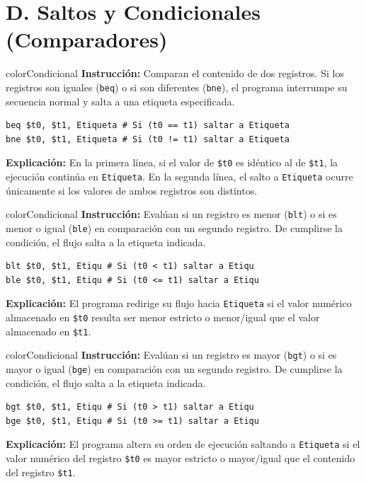 \documentclass[12pt,a4paper]{article}
\begin{document}
\section*{\textcolor{colorCondicional}{D. Saltos y Condicionales (Comparadores)}}

\begin{instructionBox}{colorCondicional}
\textbf{Instrucción:} Comparan el contenido de dos registros. Si los registros son iguales (\texttt{beq}) o si son diferentes (\texttt{bne}), el programa interrumpe su secuencia normal y salta a una etiqueta especificada.
\begin{lstlisting}
beq $t0, $t1, Etiqueta # Si (t0 == t1) saltar a Etiqueta
bne $t0, $t1, Etiqueta # Si (t0 != t1) saltar a Etiqueta
\end{lstlisting}
\textbf{Explicación:} En la primera línea, si el valor de \texttt{\$t0} es idéntico al de \texttt{\$t1}, la ejecución continúa en \texttt{Etiqueta}. En la segunda línea, el salto a \texttt{Etiqueta} ocurre únicamente si los valores de ambos registros son distintos.
\end{instructionBox}

\begin{instructionBox}{colorCondicional}
\textbf{Instrucción:} Evalúan si un registro es menor (\texttt{blt}) o si es menor o igual (\texttt{ble}) en comparación con un segundo registro. De cumplirse la condición, el flujo salta a la etiqueta indicada.
\begin{lstlisting}
blt $t0, $t1, Etiqu # Si (t0 < t1) saltar a Etiqu
ble $t0, $t1, Etiqu # Si (t0 <= t1) saltar a Etiqu
\end{lstlisting}
\textbf{Explicación:} El programa redirige su flujo hacia \texttt{Etiqueta} si el valor numérico almacenado en \texttt{\$t0} resulta ser menor estricto o menor/igual que el valor almacenado en \texttt{\$t1}.
\end{instructionBox}

\begin{instructionBox}{colorCondicional}
\textbf{Instrucción:} Evalúan si un registro es mayor (\texttt{bgt}) o si es mayor o igual (\texttt{bge}) en comparación con un segundo registro. De cumplirse la condición, el flujo salta a la etiqueta indicada.
\begin{lstlisting}
bgt $t0, $t1, Etiqu # Si (t0 > t1) saltar a Etiqu
bge $t0, $t1, Etiqu # Si (t0 >= t1) saltar a Etiqu
\end{lstlisting}
\textbf{Explicación:} El programa altera su orden de ejecución saltando a \texttt{Etiqueta} si el valor numérico del registro \texttt{\$t0} es mayor estricto o mayor/igual que el contenido del registro \texttt{\$t1}.
\end{instructionBox}
\end{document}
